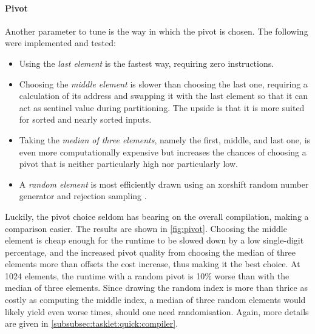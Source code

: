 \paragraph{Pivot}
Another parameter to tune is the way in which the pivot is chosen.
The following were implemented and tested:
\begin{itemize}
	\item
	Using the \emph{last element} is the fastest way, requiring zero instructions.

	\item
	Choosing the \emph{middle element} is slower than choosing the last one, requiring a calculation of its address and swapping it with the last element so that it can act as sentinel value during partitioning.
	The upside is that it is more suited for sorted and nearly sorted inputs.

	\item
	Taking the \emph{median of three elements}, namely the first, middle, and last one, is even more computationally expensive but increases the chances of choosing a pivot that is neither particularly high nor particularly low.

	\item
	A \emph{random element} is most efficiently drawn using an xorshift random number generator and rejection sampling \cite{lukas_geis}.
\end{itemize}
Luckily, the pivot choice seldom has bearing on the overall compilation, making a comparison easier.
The results are shown in \cref{fig:pivot}.
Choosing the middle element is cheap enough for the runtime to be slowed down by a low single-digit percentage, and the increased pivot quality from choosing the median of three elements more than offsets the cost increase, thus making it the best choice.
At 1024 elements, the runtime with a random pivot is 10\% worse than with the median of three elements.
Since drawing the random index is more than thrice as costly as computing the middle index, a median of three random elements would likely yield even worse times, should one need randomisation.
Again, more details are given in \cref{subsubsec:tasklet:quick:compiler}.

